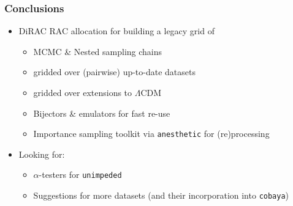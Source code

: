 \documentclass[aspectratio=169]{beamer}
\begin{document}
\begin{frame}
    \frametitle{Conclusions}
    \begin{itemize}
        \item DiRAC RAC allocation for building a legacy grid of
            \begin{itemize}
                \item MCMC \& Nested sampling chains
                \item gridded over (pairwise) up-to-date datasets
                \item gridded over extensions to $\Lambda$CDM
                \item Bijectors \& emulators for fast re-use
                \item Importance sampling toolkit via \texttt{anesthetic} for (re)processing
            \end{itemize}
        \item Looking for:
            \begin{itemize}
                \item $\alpha$-testers for \texttt{unimpeded}
                \item Suggestions for more datasets (and their incorporation into \texttt{cobaya})
            \end{itemize}
    \end{itemize}
\end{frame}
\end{document}
